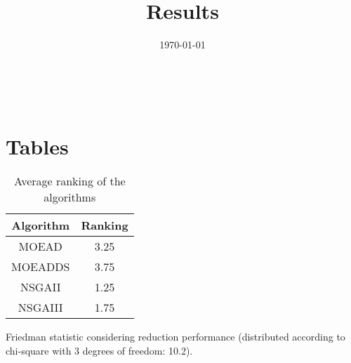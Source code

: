\documentclass{article}
\title{Results}
\author{}
\date{\today}
\begin{document}
\oddsidemargin 0in \topmargin 0in\maketitle
\
\section{Tables}
\begin{table}[!htp]
\centering
\caption{Average ranking of the algorithms}
\begin{tabular}{c|c}
Algorithm&Ranking\\
\hline
MOEAD&3.25\\
MOEADDS&3.75\\
NSGAII&1.25\\
NSGAIII&1.75\\
\end{tabular}
\end{table}


Friedman statistic considering reduction performance (distributed according to chi-square with 3 degrees of freedom: 10.2).
\end{document}

